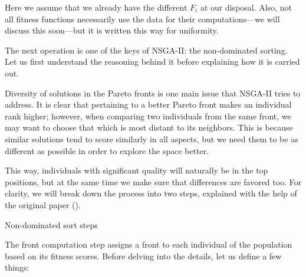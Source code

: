 	\vspace{0.3cm}

	Here we assume that we already have the different $F_i$ at our disposal. Also, not all fitness functions necessarily use the data for their computations---we will discuss this soon---but it is written this way for uniformity.

\newpage

	The next operation is one of the keys of \acs{NSGA-II}: the non-dominated sorting. Let us first understand the reasoning behind it before explaining how it is carried out.

	Diversity of solutions in the Pareto fronts is one main issue that \acs{NSGA-II} tries to address. It is clear that pertaining to a better Pareto front makes an individual rank higher; however, when comparing two individuals from the same front, we may want to choose that which is most distant to its neighbors. This is because similar solutions tend to score similarly in all aspects, but we need them to be as different as possible in order to explore the space better.

	This way, individuals with significant quality will naturally be in the top positions, but at the same time we make sure that differences are favored too. For clarity, we will break down the process into two steps, explained with the help of the original paper (\cite{deb2002fast}).

	\vspace{0.3cm}

	\begin{algorithm}[H]


		\caption{Non-dominated sort steps}

	\end{algorithm}

	\vspace{0.3cm}

	The front computation step assigns a front to each individual of the population based on its fitness scores. Before delving into the details, let us define a few things:

